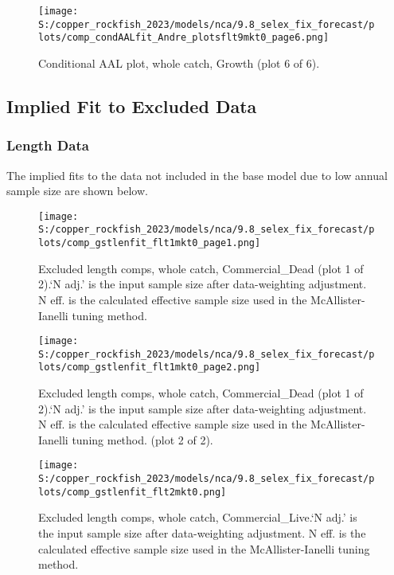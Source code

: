 \documentclass[11pt,
  english,
  letterpaper,
]{article}
\begin{document}
\begin{figure}
\centering
\texttt{[image: S:/copper\_rockfish\_2023/models/nca/9.8\_selex\_fix\_forecast/plots/comp\_condAALfit\_Andre\_plotsflt9mkt0\_page6.png]}
\caption{Conditional AAL plot, whole catch, Growth (plot 6 of 6).\label{fig:comp_condAALfit_Andre_plotsflt9mkt0_page6}}
\end{figure}

\hypertarget{excluded-data}{%
\subsection{Implied Fit to Excluded Data}\label{excluded-data}}

\hypertarget{length-data-1}{%
\subsubsection{Length Data}\label{length-data-1}}

The implied fits to the data not included in the base model due to low annual sample size are shown below.

\begin{figure}
\centering
\texttt{[image: S:/copper\_rockfish\_2023/models/nca/9.8\_selex\_fix\_forecast/plots/comp\_gstlenfit\_flt1mkt0\_page1.png]}
\caption{Excluded length comps, whole catch, Commercial\_Dead (plot 1 of 2).`N adj.' is the input sample size after data-weighting adjustment. N eff. is the calculated effective sample size used in the McAllister-Ianelli tuning method.\label{fig:comp_gstlenfit_flt1mkt0_page1}}
\end{figure}

\begin{figure}
\centering
\texttt{[image: S:/copper\_rockfish\_2023/models/nca/9.8\_selex\_fix\_forecast/plots/comp\_gstlenfit\_flt1mkt0\_page2.png]}
\caption{Excluded length comps, whole catch, Commercial\_Dead (plot 1 of 2).`N adj.' is the input sample size after data-weighting adjustment. N eff. is the calculated effective sample size used in the McAllister-Ianelli tuning method. (plot 2 of 2).\label{fig:comp_gstlenfit_flt1mkt0_page2}}
\end{figure}

\begin{figure}
\centering
\texttt{[image: S:/copper\_rockfish\_2023/models/nca/9.8\_selex\_fix\_forecast/plots/comp\_gstlenfit\_flt2mkt0.png]}
\caption{Excluded length comps, whole catch, Commercial\_Live.`N adj.' is the input sample size after data-weighting adjustment. N eff. is the calculated effective sample size used in the McAllister-Ianelli tuning method.\label{fig:comp_gstlenfit_flt2mkt0}}
\end{figure}
\end{document}
